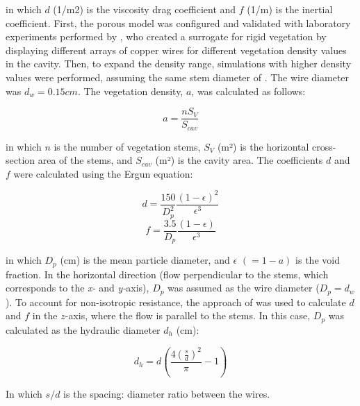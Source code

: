 in which $d$ (1/m2) is the viscosity drag coefficient and $f$ (1/m) is the inertial coefficient. First, the porous model was configured and validated with laboratory experiments performed by \textcite{xiang2019}, who created a surrogate for rigid vegetation by displaying different arrays of copper wires for different vegetation density values in the cavity. Then, to expand the density range, simulations with higher density values were performed, assuming the same stem diameter of \textcite{xiang2019}. The wire diameter was $d_w = 0.15 cm$. The vegetation density, $a$, was calculated as follows:

\begin{equation}
a=\frac{n S_V}{S_{cav}}
\label{eqn:art4:a}
\end{equation}

in which $n$ is the number of vegetation stems, $S_V$ (m²) is the horizontal cross-section area of the stems, and $S_{cav}$ (m²) is the cavity area. The coefficients $d$ and $f$ were calculated using the Ergun equation:

\begin{equation}
d=\frac{150}{D_{p}^{2}}\frac{\left ( 1-\epsilon \right )^2}{\epsilon^3}
\label{eqn:art4:d}
\end{equation}
\begin{equation}
f=\frac{3.5}{D_{p}}\frac{\left ( 1-\epsilon \right )}{\epsilon^3}
\label{eqn:art4:f}
\end{equation}

in which $D_p$ (cm) is the mean particle diameter, and $\epsilon$ $(= 1-a)$ is the void fraction. In the horizontal direction (flow perpendicular to the stems, which corresponds to the \textit{x-} and \textit{y-}axis), $D_p$ was assumed as the wire diameter ($D_p = d_w$). To account for non-isotropic resistance, the approach of \textcite{oldham2001} was used to calculate $d$ and $f$ in the $z$-axis, where the flow is parallel to the stems. In this case, $D_p$ was calculated as the hydraulic diameter $d_h$ (cm): 

\begin{equation}
d_h=d\left ( \frac{4\left ( \frac{s}{d} \right )^2}{\pi} - 1\right )
\label{eqn:art4:dh}
\end{equation}

In which $s/d$ is the spacing: diameter ratio between the wires.

